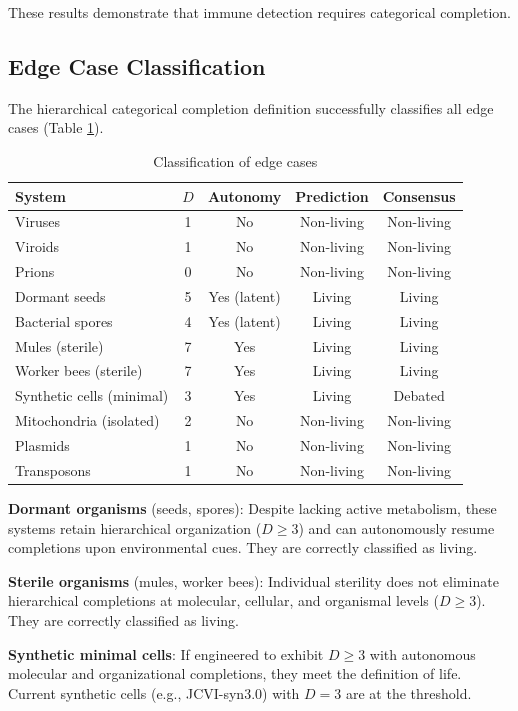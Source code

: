 \documentclass[11pt]{article}
\begin{document}
These results demonstrate that immune detection requires categorical completion.

\subsection{Edge Case Classification}

The hierarchical categorical completion definition successfully classifies all edge cases (Table \ref{tab:edge_cases}).

\begin{table}[h]
\centering
\caption{Classification of edge cases}
\label{tab:edge_cases}
\begin{tabular}{lcccc}
\hline
\textbf{System} & \textbf{$D$} & \textbf{Autonomy} & \textbf{Prediction} & \textbf{Consensus} \\
\hline
Viruses & 1 & No & Non-living & Non-living \\
Viroids & 1 & No & Non-living & Non-living \\
Prions & 0 & No & Non-living & Non-living \\
Dormant seeds & 5 & Yes (latent) & Living & Living \\
Bacterial spores & 4 & Yes (latent) & Living & Living \\
Mules (sterile) & 7 & Yes & Living & Living \\
Worker bees (sterile) & 7 & Yes & Living & Living \\
Synthetic cells (minimal) & 3 & Yes & Living & Debated \\
Mitochondria (isolated) & 2 & No & Non-living & Non-living \\
Plasmids & 1 & No & Non-living & Non-living \\
Transposons & 1 & No & Non-living & Non-living \\
\hline
\end{tabular}
\end{table}

\textbf{Dormant organisms} (seeds, spores): Despite lacking active metabolism, these systems retain hierarchical organization ($D \geq 3$) and can autonomously resume completions upon environmental cues. They are correctly classified as living.

\textbf{Sterile organisms} (mules, worker bees): Individual sterility does not eliminate hierarchical completions at molecular, cellular, and organismal levels ($D \geq 3$). They are correctly classified as living.

\textbf{Synthetic minimal cells}: If engineered to exhibit $D \geq 3$ with autonomous molecular and organizational completions, they meet the definition of life. Current synthetic cells (e.g., JCVI-syn3.0) with $D = 3$ are at the threshold.
\end{document}
